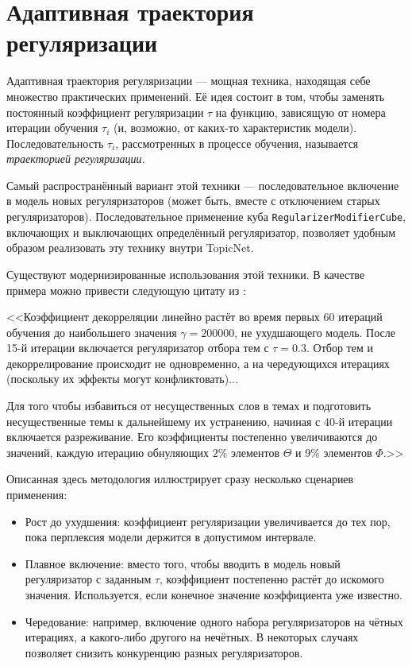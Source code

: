 \section{Адаптивная траектория регуляризации}



Адаптивная траектория регуляризации --- мощная техника, находящая себе множество практических применений. Её идея состоит в том, чтобы заменять постоянный коэффициент регуляризации $\tau$ на функцию, зависящую от номера итерации обучения $\tau_i$ (и, возможно, от каких-то характеристик модели). Последовательность $\tau_i$, рассмотренных в процессе обучения, называется \textit{траекторией регуляризации}.  

Самый распространённый вариант этой техники --- последовательное включение в модель новых регуляризаторов (может быть, вместе с отключением старых регуляризаторов). Последовательное применение куба \texttt{RegularizerModifierCube}, включающих и выключающих определённый регуляризатор, позволяет удобным образом реализовать эту технику внутри TopicNet.  

Существуют модернизированные использования этой техники. В качестве примера можно привести следующую цитату из \cite{plavin}: 

<<Коэффициент декорреляции линейно растёт во время первых 60 итераций обучения до наибольшего значения $\gamma = 200000$, не ухудшающего модель. После 15-й итерации включается регуляризатор отбора тем с $\tau=0.3$. Отбор тем и декоррелирование происходит не одновременно, а на чередующихся итерациях (поскольку их эффекты могут конфликтовать)...  

Для того чтобы избавиться от несущественных слов в темах и подготовить несущественные темы к дальнейшему их устранению, начиная с 40-й итерации включается разреживание. Его коэффициенты постепенно увеличиваются до значений, каждую итерацию обнуляющих $2\%$ элементов $\Theta$ и $9\%$ элементов $\Phi$.>> 

Описанная здесь методология иллюстрирует сразу несколько сценариев применения: 

\begin{itemize}
    \item Рост до ухудшения: коэффициент регуляризации увеличивается до тех пор, пока перплексия модели держится в допустимом интервале.
    \item Плавное включение: вместо того, чтобы вводить в модель новый регуляризатор с заданным $\tau$, коэффициент постепенно растёт до искомого значения. Используется, если конечное значение коэффициента уже известно.
    \item Чередование: например, включение одного набора регуляризаторов на чётных итерациях, а какого-либо другого на нечётных. В некоторых случаях позволяет снизить конкуренцию разных регуляризаторов.
\end{itemize} 

